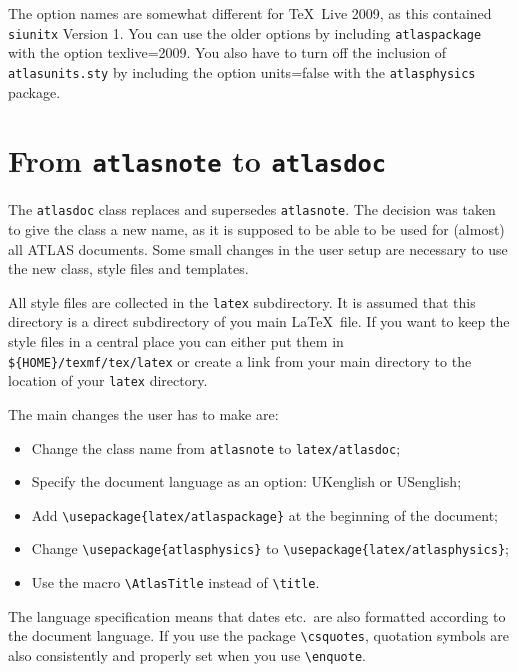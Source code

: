 \documentclass[atlasstyle,UKenglish]{latex/atlasdoc}
\newcommand{\File}[1]{\texttt{#1}\xspace}
\newcommand{\Macro}[1]{\texttt{\textbackslash #1}\xspace}
\newcommand{\Option}[1]{\textsf{#1}\xspace}
\newcommand{\Package}[1]{\texttt{#1}\xspace}
\begin{document}
The option names are somewhat different for \TeX\ Live 2009,
as this contained \Package{siunitx} Version 1.
You can use the older options by including \Package{atlaspackage} with the 
option \Option{texlive=2009}.
You also have to turn off the inclusion of \File{atlasunits.sty} by including the option \Option{units=false} with
the \Package{atlasphysics} package.


\section{From \texttt{atlasnote} to \texttt{atlasdoc}}
\label{sec:oldnote}

The \texttt{atlasdoc} class replaces and supersedes \texttt{atlasnote}.
The decision was taken to give the class a new name, as it is supposed to be
able to be used for (almost) all ATLAS documents.
Some small changes in the user setup are necessary to use the new
class, style files and templates.

All style files are collected in the \texttt{latex} subdirectory.
It is assumed that this directory is a direct subdirectory of you main \LaTeX\ file.
If you want to keep the style files in a central place you can either put them in
\verb|${HOME}/texmf/tex/latex| or create a link from your main directory to the location of
your \texttt{latex} directory.

The main changes the user has to make are:
\begin{itemize}
\item Change the class name from \texttt{atlasnote} to \texttt{latex/atlasdoc};
\item Specify the document language as an option: UKenglish or USenglish;
\item Add \verb|\usepackage{latex/atlaspackage}| at the beginning of the document;
\item Change \verb|\usepackage{atlasphysics}| to \verb|\usepackage{latex/atlasphysics}|; 
\item Use the macro \Macro{AtlasTitle} instead of \Macro{title}.
\end{itemize}

The language specification means that dates etc.\ are also formatted according to 
the document language. 
If you use the package \Macro{csquotes}, quotation symbols are also consistently and properly set
when you use \Macro{enquote}.
\end{document}

